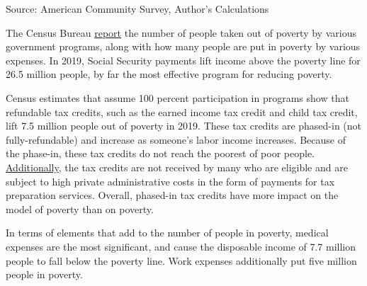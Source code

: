 \documentclass{report}
\begin{document}
{\vspace{-5mm}
\footnotesize{Source: American Community Survey, Author's Calculations}

\newpage
\begin{minipage}{0.76\textwidth}
\small The Census Bureau \href{https://www.census.gov/library/publications/2020/demo/p60-272.html}{report} the number of people taken out of poverty by various government programs, along with how many people are put in poverty by various expenses. In 2019, Social Security payments lift income above the poverty line for 26.5 million people, by far the most effective program for reducing poverty.

Census estimates that assume 100 percent participation in programs show that refundable tax credits, such as the earned income tax credit and child tax credit, lift 7.5 million people out of poverty in 2019. These tax credits are phased-in (not fully-refundable) and increase as someone's labor income increases. Because of the phase-in, these tax credits do not reach the poorest of poor people. \href{https://www.peoplespolicyproject.org/2020/05/18/the-myths-of-the-earned-income-tax-credit/}{Additionally}, the tax credits are not received by many who are eligible and are subject to high private administrative costs in the form of payments for tax preparation services. Overall, phased-in tax credits have more impact on the model of poverty than on poverty.

In terms of elements that add to the number of people in poverty, medical expenses are the most significant, and cause the disposable income of 7.7 million people to fall below the poverty line. Work expenses additionally put five million people in poverty.

\vspace{5mm}


\end{minipage}}
\end{document}
